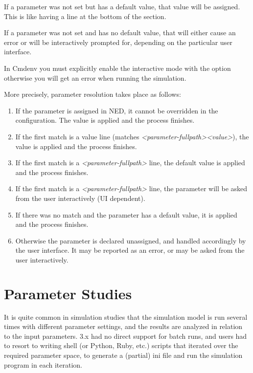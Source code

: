 If a parameter was not set but has a default value, that value will be
assigned. This is like having a  line at the
bottom of the \ttt{[General]} section.

If a parameter was not set and has no default value, that will either
cause an error or will be interactively prompted for, depending
on the particular user interface.

\begin{note}
In Cmdenv you must explicitly enable the interactive mode with the
 option otherwise you will get an error
when running the simulation.
\end{note}

More precisely, parameter resolution takes place as follows:

\begin{enumerate}
\item If the parameter is assigned in NED, it cannot be overridden in the
    configuration. The value is applied and the process finishes.
\item If the first match is a value line (matches
    \textit{<parameter-fullpath>}\ttt{=}\textit{<value>}), the value is
    applied and the process finishes.
\item If the first match is a \textit{<parameter-fullpath>} line,
    the default value is applied and the process finishes.
\item If the first match is a \textit{<parameter-fullpath>} line,
    the parameter will be asked from the user interactively (UI dependent).
\item If there was no match and the parameter has a default value, it is applied
    and the process finishes.
\item Otherwise the parameter is declared unassigned, and handled accordingly
    by the user interface. It may be reported as an error, or may be
    asked from the user interactively.
\end{enumerate}


\section{Parameter Studies}
\label{sec:config-sim:parameter-studies}

It is quite common in simulation studies that the simulation model is
run several times with different parameter settings, and the results
are analyzed in relation to the input parameters. {\opp} 3.x had no
direct support for batch runs, and users had to resort to writing shell
(or Python, Ruby, etc.) scripts that iterated over the required
parameter space, to generate a (partial) ini file and run the
simulation program in each iteration.

